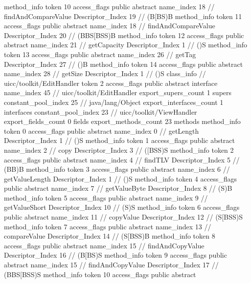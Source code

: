 {{{{{				}
				method_info {
					token	10
					access_flags	public abstract
					name_index	18		// findAndCompareValue
					Descriptor_Index	19		// (B[BS)B
				}
				method_info {
					token	11
					access_flags	public abstract
					name_index	18		// findAndCompareValue
					Descriptor_Index	20		// (BBS[BSS)B
				}
				method_info {
					token	12
					access_flags	public abstract
					name_index	21		// getCapacity
					Descriptor_Index	1		// ()S
				}
				method_info {
					token	13
					access_flags	public abstract
					name_index	26		// getTag
					Descriptor_Index	27		// ()B
				}
				method_info {
					token	14
					access_flags	public abstract
					name_index	28		// getSize
					Descriptor_Index	1		// ()S
				}
			}
		}
		class_info {		// uicc/toolkit/EditHandler
			token	2
			access_flags	public abstract interface
			name_index	45		// uicc/toolkit/EditHandler
			export_supers_count	1
			supers {
				constant_pool_index	25		// java/lang/Object
			}
			export_interfaces_count	1
			interfaces {
				constant_pool_index	23		// uicc/toolkit/ViewHandler
			}
			export_fields_count	0
			fields {
			}
			export_methods_count	23
			methods {
				method_info {
					token	0
					access_flags	public abstract
					name_index	0		// getLength
					Descriptor_Index	1		// ()S
				}
				method_info {
					token	1
					access_flags	public abstract
					name_index	2		// copy
					Descriptor_Index	3		// ([BSS)S
				}
				method_info {
					token	2
					access_flags	public abstract
					name_index	4		// findTLV
					Descriptor_Index	5		// (BB)B
				}
				method_info {
					token	3
					access_flags	public abstract
					name_index	6		// getValueLength
					Descriptor_Index	1		// ()S
				}
				method_info {
					token	4
					access_flags	public abstract
					name_index	7		// getValueByte
					Descriptor_Index	8		// (S)B
				}
				method_info {
					token	5
					access_flags	public abstract
					name_index	9		// getValueShort
					Descriptor_Index	10		// (S)S
				}
				method_info {
					token	6
					access_flags	public abstract
					name_index	11		// copyValue
					Descriptor_Index	12		// (S[BSS)S
				}
				method_info {
					token	7
					access_flags	public abstract
					name_index	13		// compareValue
					Descriptor_Index	14		// (S[BSS)B
				}
				method_info {
					token	8
					access_flags	public abstract
					name_index	15		// findAndCopyValue
					Descriptor_Index	16		// (B[BS)S
				}
				method_info {
					token	9
					access_flags	public abstract
					name_index	15		// findAndCopyValue
					Descriptor_Index	17		// (BBS[BSS)S
				}
				method_info {
					token	10
					access_flags	public abstract
}}}}}
